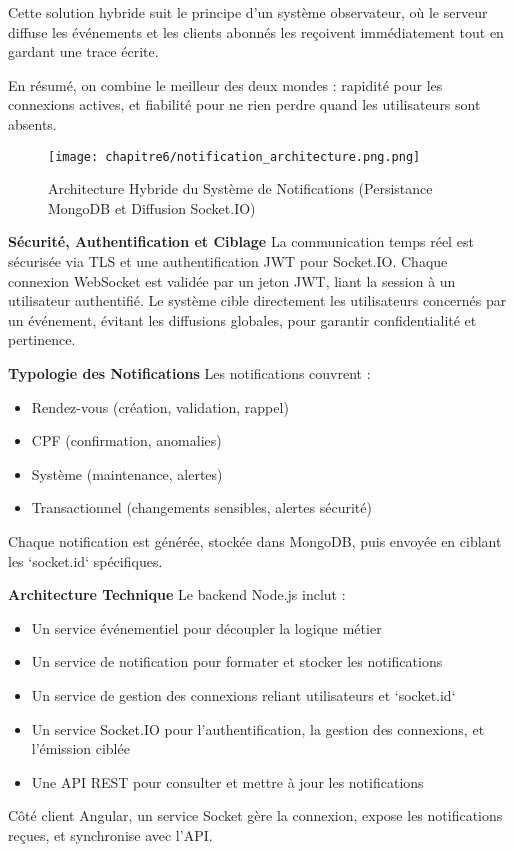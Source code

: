 Cette solution hybride suit le principe d’un système observateur, où le serveur diffuse les événements et les clients abonnés les reçoivent immédiatement tout en gardant une trace écrite.

En résumé, on combine le meilleur des deux mondes : rapidité pour les connexions actives, et fiabilité pour ne rien perdre quand les utilisateurs sont absents.

\begin{figure}[H]
\centering
\texttt{[image: chapitre6/notification\_architecture.png.png]}
\caption{Architecture Hybride du Système de Notifications (Persistance MongoDB et Diffusion Socket.IO)}
\label{fig:notification_architecture}
\end{figure}

\textbf{Sécurité, Authentification et Ciblage}
La communication temps réel est sécurisée via TLS et une authentification JWT pour Socket.IO. Chaque connexion WebSocket est validée par un jeton JWT, liant la session à un utilisateur authentifié. Le système cible directement les utilisateurs concernés par un événement, évitant les diffusions globales, pour garantir confidentialité et pertinence.

\textbf{Typologie des Notifications}
Les notifications couvrent :
\begin{itemize}
    \item Rendez-vous (création, validation, rappel)
    \item CPF (confirmation, anomalies)
    \item Système (maintenance, alertes)
    \item Transactionnel (changements sensibles, alertes sécurité)
\end{itemize}
Chaque notification est générée, stockée dans MongoDB, puis envoyée en ciblant les `socket.id` spécifiques.

\textbf{Architecture Technique}
Le backend Node.js inclut :
\begin{itemize}
    \item Un service événementiel pour découpler la logique métier
    \item Un service de notification pour formater et stocker les notifications
    \item Un service de gestion des connexions reliant utilisateurs et `socket.id`
    \item Un service Socket.IO pour l’authentification, la gestion des connexions, et l’émission ciblée
    \item Une API REST pour consulter et mettre à jour les notifications
\end{itemize}
Côté client Angular, un service Socket gère la connexion, expose les notifications reçues, et synchronise avec l’API.

